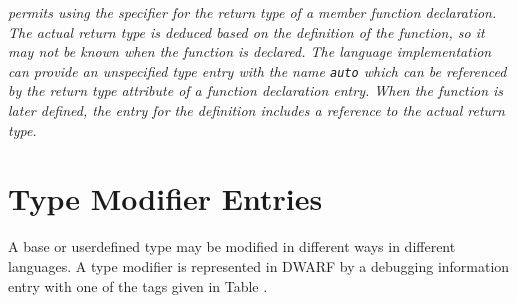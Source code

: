 \textit{ permits using the
\autoreturntype{} specifier for the return type of a member function declaration.
The actual return type is deduced based on the definition of the
function, so it may not be known when the function is declared.  The language
implementation can provide an unspecified type entry with the name \texttt{auto} which
can be referenced by the return type attribute of a function declaration entry.
When the function is later defined, the \DWTAGsubprogram{} entry for the definition
includes a reference to the actual return type.}


\section{Type Modifier Entries}
\label{chap:typemodifierentries}
A base or user\dash defined type may be modified in different ways
in different languages. A type modifier is represented in
DWARF by a debugging information entry with one of the tags
given in Table .

